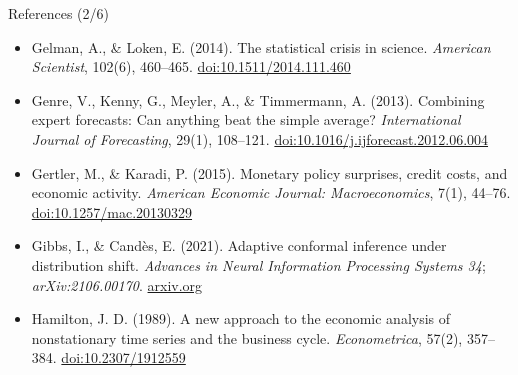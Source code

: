 \begin{frame}{References (2/6)}
\begin{itemize}
    \item Gelman, A., \& Loken, E. (2014). The statistical crisis in science. \textit{American Scientist}, 102(6), 460--465. \href{https://doi.org/10.1511/2014.111.460}{doi:10.1511/2014.111.460}
    \item Genre, V., Kenny, G., Meyler, A., \& Timmermann, A. (2013). Combining expert forecasts: Can anything beat the simple average? \textit{International Journal of Forecasting}, 29(1), 108--121. \href{https://doi.org/10.1016/j.ijforecast.2012.06.004}{doi:10.1016/j.ijforecast.2012.06.004}
    \item Gertler, M., \& Karadi, P. (2015). Monetary policy surprises, credit costs, and economic activity. \textit{American Economic Journal: Macroeconomics}, 7(1), 44--76. \href{https://doi.org/10.1257/mac.20130329}{doi:10.1257/mac.20130329}
    \item Gibbs, I., \& Candès, E. (2021). Adaptive conformal inference under distribution shift. \textit{Advances in Neural Information Processing Systems 34}; \textit{arXiv:2106.00170}. \href{https://arxiv.org/abs/2106.00170}{arxiv.org}
    \item Hamilton, J. D. (1989). A new approach to the economic analysis of nonstationary time series and the business cycle. \textit{Econometrica}, 57(2), 357--384. \href{https://doi.org/10.2307/1912559}{doi:10.2307/1912559}
\end{itemize}
\end{frame}

